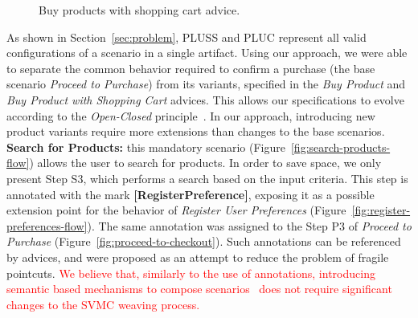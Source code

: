 \begin{figure}[h]
\caption{Buy products with shopping cart advice.}
\label{fig:buy-product-changing-flow}
\end{figure}

As shown in Section~\ref{sec:problem}, PLUSS and PLUC represent all valid
configurations of a scenario in a single artifact. Using our approach, we were
able to separate the common behavior required to confirm a purchase (the base
scenario \emph{Proceed to Purchase}) from its variants, specified in the
\emph{Buy Product} and \emph{Buy Product with Shopping Cart} advices. This allows
our specifications to evolve according to the \emph{Open-Closed}
principle~\cite{Meyer:2000aa}. In our approach, introducing new product variants
require more extensions than changes to the base scenarios. {\bf Search for
Products:} this mandatory scenario (Figure~\ref{fig:search-products-flow}) allows
the user to search for products. In order to save space, we only present Step S3,
which performs a search based on the input criteria. This step is annotated with
the mark \mbox{{\bf [RegisterPreference]}}, exposing it as a possible extension
point for the behavior of \emph{Register User Preferences}
(Figure~\ref{fig:register-preferences-flow}). The same annotation was assigned to
the Step P3 of \emph{Proceed to Purchase} (Figure~\ref{fig:proceed-to-checkout}).
Such annotations can be referenced by advices, and were proposed as an attempt to
reduce the problem of fragile pointcuts. \textcolor{red}{We believe that,
similarly to the use of annotations, introducing semantic based mechanisms to
compose scenarios~\cite{Chitchyan:2007aa} does not require significant changes to
the SVMC weaving process.}


